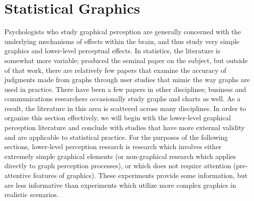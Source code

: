 \documentclass[11pt]{isuthesis}\usepackage[]{graphicx}\usepackage[]{color}
\begin{document}
\section{Statistical Graphics}
Psychologists who study graphical perception are generally concerned with the underlying mechanisms of effects within the brain, and thus study very simple graphics and lower-level perceptual effects. In statistics, the literature is somewhat more variable; \citet{cleveland:1985} produced the seminal paper on the subject, but outside of that work, there are relatively few papers that examine the accuracy of judgments made from graphs through user studies that mimic the way graphs are used in practice. There have been a few papers in other disciplines; business and communications researchers occasionally study graphs and charts as well. As a result, the literature in this area is scattered across many disciplines. In order to organize this section effectively, we will begin with the lower-level graphical perception literature and conclude with studies that have more external validity and are applicable to statistical practice. For the purposes of the following sections, lower-level perception research is research which involves either extremely simple graphical elements (or non-graphical research which applies directly to graph perception processes), or which does not require attention (pre-attentive features of graphics). These experiments provide some information, but are less informative than experiments which utilize more complex graphics in realistic scenarios. 
\end{document}
